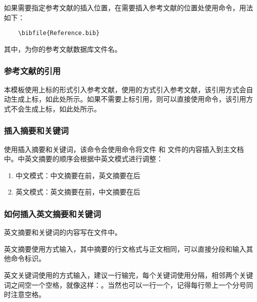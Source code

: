 \documentclass{nitthesis}
\begin{document}
如果需要指定参考文献的插入位置，在需要插入参考文献的位置处使用命令，用法如下：

\begin{lstlisting}
    \bibfile{Reference.bib}
\end{lstlisting}

其中，为你的参考文献数据库文件名。

\subsubsection{参考文献的引用}

本模板使用上标的形式引入参考文献，使用的方式引入参考文献，该引用方式会自动生成上标，如此处所示。如果不需要上标引用，则可以直接使用命令，该引用方式不会生成上标，如此处\cite{全权2020低空无人机交通管理概览与建议}所示。

\subsubsection{插入摘要和关键词}

使用插入摘要和关键词，该命令会使用命令将文件  和  文件的内容插入到主文档中。中英文摘要的顺序会根据中英文模式进行调整：

\begin{enumerate}
    \item 中文模式：中文摘要在前，英文摘要在后
    \item 英文模式：英文摘要在前，中文摘要在后
\end{enumerate}

\subsubsection{如何插入英文摘要和关键词}

英文摘要和关键词的内容写在文件中。

英文摘要使用方式输入，其中摘要的行文格式与正文相同，可以直接分段和输入其他命令标识。

英文关键词使用的方式输入，建议一行输完，每个关键词使用\Code{;}分隔，相邻两个关键词之间空一个空格，就像这样：。当然也可以一行一个，记得每行带上一个分号同时注意空格。
\end{document}
